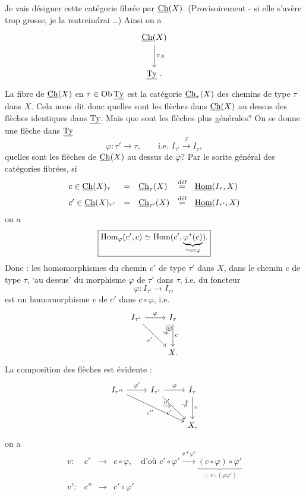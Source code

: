 Je vais désigner cette catégorie fibrée par $\underline{\mathrm{Ch}}(X)$. (Provisoirement - si elle s'avère trop grosse, je la restreindrai \dots) Ainsi on a
\[
\begin{tikzcd}[row sep=large]
\uCh(X) \arrow[d, "\pi_X"] \\
\uTy\ .
\end{tikzcd}
\]
La fibre de $\underline{\mathrm{Ch}}(X)$ en $\tau\in\mathrm{Ob}\,\underline{\mathrm{Ty}}$ est la catégorie $\underline{\mathrm{Ch}}_\tau(X)$ des chemins de type $\tau$ dans $X$. Cela nous dit donc quelles sont les flèches dans $\underline{\mathrm{Ch}}(X)$ au dessus des flèches identiques dans $\underline{\mathrm{Ty}}$. Mais que sont les flèches plus générales? On se donne une flèche dans $\underline{\mathrm{Ty}}$
\[
\varphi : \tau' \longrightarrow \tau, \qquad \text{i.e. } I_{\tau'} \xrightarrow{\varphi} I_\tau,
\]
quelles sont les flèches de $\underline{\mathrm{Ch}}(X)$ au dessus de $\varphi$? Par le sorite général des catégories fibrées, si
\[
\begin{array}{lclcl}
c\in\underline{\mathrm{Ch}}(X)_\tau & = & \underline{\mathrm{Ch}}_\tau(X) & \overset{\text{déf}}{=} & \underline{\mathrm{Hom}}(I_\tau,X)\\[1ex]
c'\in\underline{\mathrm{Ch}}(X)_{\tau'} & = & \underline{\mathrm{Ch}}_{\tau'}(X) & \overset{\text{déf}}{=} & \underline{\mathrm{Hom}}(I_{\tau'},X)
\end{array}
\]
on a
\[
\boxed{\mathrm{Hom}_\varphi(c',c)\simeq\mathrm{Hom}(c',\underbrace{\varphi^*(c)}_{=c\circ\varphi}).}
\]
Donc : les homomorphismes du
chemin $c'$ de type $\tau'$ dans $X$, dans le chemin $c$ de type $\tau$, ‘au dessus’ du morphisme $\varphi$ de $\tau'$ dans $\tau$, i.e. du foncteur
\[
\varphi : I_{\tau'} \longrightarrow I_\tau,
\]
est un homomorphisme $v$ de $c'$ dans $c\circ\varphi$, i.e.
\[
\begin{tikzcd}[row sep=large]
I_{\tau'} \arrow[r, "\varphi"] \arrow[dr, "c'"', ""{name=A}] & I_\tau \arrow[d, "c", ""'{name=B}] \\
& X.
\arrow[from=A, to=B, bend left=20, shorten <=6pt, shorten >=2pt, "\circled{v}"]
\end{tikzcd}
\]
La composition des flèches est évidente :
\[
\begin{tikzcd}[row sep=large]
I_{\tau''} \arrow[r, "\varphi'"] \arrow[drr, "c''"', ""{name=C}] & I_{\tau'} \arrow[r, "\varphi"] \arrow[dr, "c'"', ""{name=A}] & I_\tau \arrow[d, "c", ""'{name=B}] \\
& & X,
\arrow[from=A, to=B, bend left=20, shorten <=6pt, shorten >=2pt, "v"]
\arrow[from=C, to=A, shorten <=4pt, shorten >=4pt, "v'"]
\end{tikzcd}
\]
on a
\[
\begin{array}{rccl}
v : & c' & \longrightarrow & c\circ\varphi, \quad \text{d'où } c'\circ\varphi' \xrightarrow{v*\varphi'} \underbrace{(c\circ\varphi)\circ\varphi'}_{=c\circ(\varphi\varphi')}\\[3ex]
v' : & c'' & \longrightarrow & c'\circ\varphi'
\end{array}
\]
